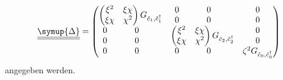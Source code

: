 \[
    \def\spacednull{\rlap{0}\phantom{\gamma_{01}^2\gamma_{11}}}
    \def\nullblock{\begin{matrix}\spacednull&\spacednull\\\spacednull&\spacednull\end{matrix}}
    \def\nullrow{\begin{matrix}\spacednull&\spacednull\end{matrix}}
% 
% 
     \underline{\underline{\symup{\Delta}}} = 
\begin{pmatrix}
    \begin{pmatrix}
        \xi^2           & \xi \chi                \\
        \xi\chi  & \chi^2                         \\
    \end{pmatrix} G_{\tilde{c}_1, \tilde{c}^\dagger_1}   &   \nullblock  &   \begin{matrix}0\\0\end{matrix}            \\
    \nullblock      & \begin{pmatrix}
                        \xi^2           & \xi\chi\\
                        \xi\chi  & \chi^2         \\
                      \end{pmatrix} G_{\tilde{c}_2, \tilde{c}^\dagger_2}  &   \begin{matrix}0\\0\end{matrix}          \\
    \nullrow      &   \nullrow  &   \zeta^2           G_{\tilde{c}_0, \tilde{c}^\dagger_0}       \\
\end{pmatrix}
\]
angegeben werden.
